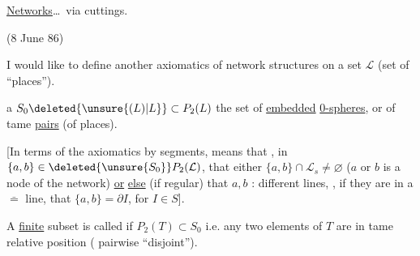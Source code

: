
\uline{Networks}\ldots\ via cuttings.

(8 June 86)



I would like to define another axiomatics of 
 network structures
on a set $\mathcal L$ (set of ``places'').

\textcircled{\scriptsize a}\quad $S_0\deleted{\unsure{(L)|L}}\subset P_2(L)$ the set of \uline{embedded}
\uline{0-spheres}, or of tame \uline{pairs}  (of
places). 


[In terms of the axiomatics by segments,
 means that  ,
 in $\{a,b\}\in\deleted{\unsure{S_0}}P_2(\mathcal L)$, that
either $\{a,b\}\cap\mathcal L_s\ne\varnothing$ ($a$ or $b$ is a
node  of the network) \uline{or} \uline{else} 
(if   regular) that $a,b$   :
different lines, , if they are
in a $\bar{=}$ line, that $\{a,b\}=\partial I$,
for $I\in S$].

 A \uline{finite} subset  is called  
if  $P_2(T)\subset S_0$
i.e. any two elements of $T$ are in
tame relative position ( pairwise ``disjoint'').

